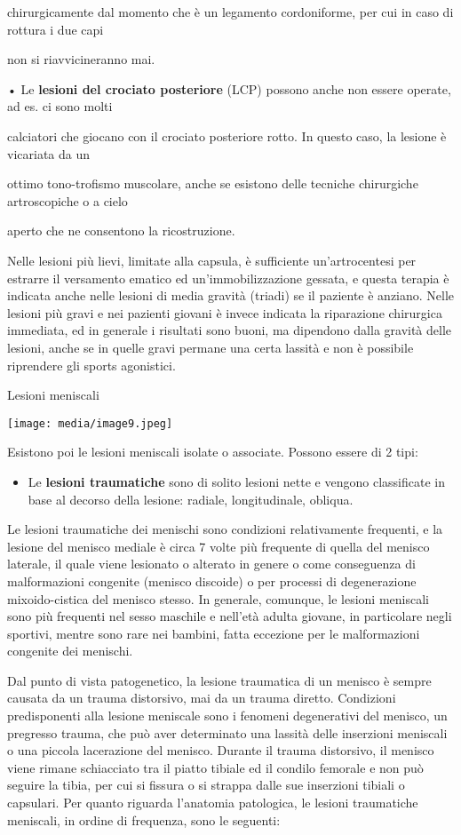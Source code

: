 \documentclass[]{article}
\begin{document}
chirurgicamente dal momento che è un legamento cordoniforme, per cui in
caso di rottura i due capi

non si riavvicineranno mai.

• Le \textbf{lesioni del crociato posteriore} (LCP) possono anche non
essere operate, ad es. ci sono molti

calciatori che giocano con il crociato posteriore rotto. In questo caso,
la lesione è vicariata da un

ottimo tono-trofismo muscolare, anche se esistono delle tecniche
chirurgiche artroscopiche o a cielo

aperto che ne consentono la ricostruzione.

Nelle lesioni più lievi, limitate alla capsula, è sufficiente
un'artrocentesi per estrarre il versamento ematico ed
un'immobilizzazione gessata, e questa terapia è indicata anche nelle
lesioni di media gravità (triadi) se il paziente è anziano. Nelle
lesioni più gravi e nei pazienti giovani è invece indicata la
riparazione chirurgica immediata, ed in generale i risultati sono buoni,
ma dipendono dalla gravità delle lesioni, anche se in quelle gravi
permane una certa lassità e non è possibile riprendere gli sports
agonistici.

Lesioni meniscali

\texttt{[image: media/image9.jpeg]}

Esistono poi le lesioni meniscali isolate o associate. Possono essere di
2 tipi:

\begin{itemize}
\item
  Le \textbf{lesioni traumatiche} sono di solito lesioni nette e vengono
  classificate in base al decorso della lesione: radiale, longitudinale,
  obliqua.
\end{itemize}

Le lesioni traumatiche dei menischi sono condizioni relativamente
frequenti, e la lesione del menisco mediale è circa 7 volte più
frequente di quella del menisco laterale, il quale viene lesionato o
alterato in genere o come conseguenza di malformazioni congenite
(menisco discoide) o per processi di degenerazione mixoido-cistica del
menisco stesso. In generale, comunque, le lesioni meniscali sono più
frequenti nel sesso maschile e nell'età adulta giovane, in particolare
negli sportivi, mentre sono rare nei bambini, fatta eccezione per le
malformazioni congenite dei menischi.

Dal punto di vista patogenetico, la lesione traumatica di un menisco è
sempre causata da un trauma distorsivo, mai da un trauma diretto.
Condizioni predisponenti alla lesione meniscale sono i fenomeni
degenerativi del menisco, un pregresso trauma, che può aver determinato
una lassità delle inserzioni meniscali o una piccola lacerazione del
menisco. Durante il trauma distorsivo, il menisco viene rimane
schiacciato tra il piatto tibiale ed il condilo femorale e non può
seguire la tibia, per cui si fissura o si strappa dalle sue inserzioni
tibiali o capsulari. Per quanto riguarda l'anatomia patologica, le
lesioni traumatiche meniscali, in ordine di frequenza, sono le seguenti:
\end{document}
